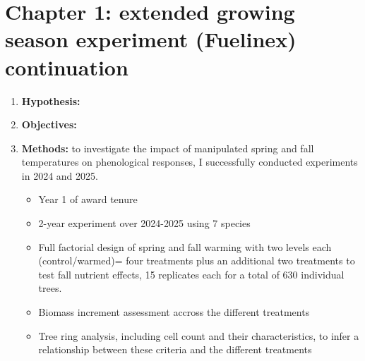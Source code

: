 \documentclass{article}
\begin{document}
\section*{Chapter 1: extended growing season experiment (Fuelinex) continuation}
\begin {enumerate}
	\item \textbf{Hypothesis:}
	\item \textbf{Objectives:}
	\item \textbf{Methods:} to investigate the impact of manipulated spring and fall temperatures on phenological responses, I successfully conducted experiments in 2024 and 2025.
	\begin{itemize}
			\item Year 1 of award tenure
			\item 2-year experiment over 2024-2025 using 7 species
			\item Full factorial design of spring and fall warming with two levels each (control/warmed)= four treatments plus an additional two treatments to test fall nutrient effects, 15 replicates each for a total of 630 individual trees.
			\item Biomass increment assessment accross the different treatments
			\item Tree ring analysis, including cell count and their characteristics, to infer a relationship between these criteria and the different treatments
		\end{itemize}
\end {enumerate}
\end{document}
